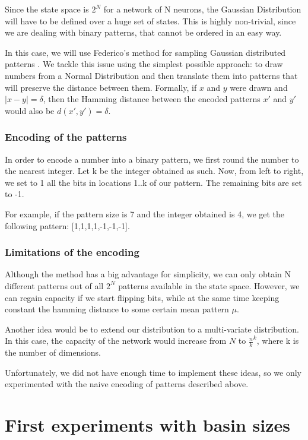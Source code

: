 Since the state space is \( 2^N \) for a network of N neurons, the Gaussian Distribution will have to be defined over a huge set of states. This is highly non-trivial, since we are dealing with binary patterns, that cannot be ordered in an easy way.

In this case, we will use Federico's method for sampling Gaussian distributed patterns \cite[p.~33]{federico}. We tackle this issue using the simplest possible approach: to draw numbers from a Normal Distribution and then translate them into patterns that will preserve the distance between them. Formally, if \(x\) and \(y\) were drawn and \( |x-y|=\delta\), then the Hamming distance between the encoded patterns \(x'\) and \(y'\) would also be \( d(x',y')=\delta\).

\subsubsection{Encoding of the patterns}

In order to encode a number into a binary pattern, we first round the number to the nearest integer. Let k be the integer obtained as such. Now, from left to right, we set to 1 all the bits in locations 1..k of our pattern. The remaining bits are set to -1.

For example, if the pattern size is 7 and the integer obtained is 4, we get the following pattern: [1,1,1,1,-1,-1,-1].

\subsubsection{Limitations of the encoding}

Although the method has a big advantage for simplicity, we can only obtain N different patterns out of all \( 2^N\) patterns available in the state space. However, we can regain capacity if we start flipping bits, while at the same time keeping constant the hamming distance to some certain mean pattern \(\mu\).

Another idea would be to extend our distribution to a multi-variate distribution. In this case, the capacity of the network would increase from \(N\) to \(\frac{n}{k}^k\), where k is the number of dimensions.

Unfortunately, we did not have enough time to implement these ideas, so we only experimented with the naive encoding of patterns described above.


\section{First experiments with basin sizes}
\label{sec:fexp}

